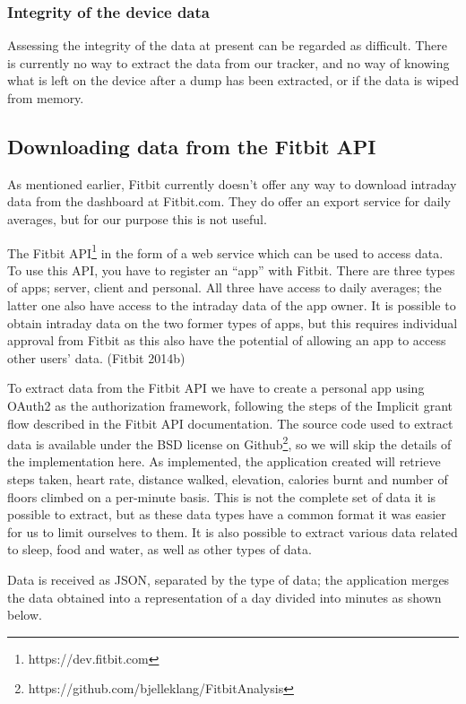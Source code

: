 \documentclass[a4paper,11pt,dvips]{article}
\begin{document}
\subsubsection{Integrity of the device data}
Assessing the integrity of the data at present can be regarded as difficult. There is currently no way to extract the data from our tracker, and no way of knowing what is left on the device after a dump has been extracted, or if the data is wiped from memory.


\subsection{Downloading data from the Fitbit API}
As mentioned earlier, Fitbit currently doesn't offer any way to download intraday data from the dashboard at Fitbit.com. They do offer an export service for daily averages, but for our purpose this is not useful.

The Fitbit API\footnote{https://dev.fitbit.com} in the form of a web service which can be used to access data. To use this API, you have to register an “app” with Fitbit. There are three types of apps; server, client and personal. All three have access to daily averages; the latter one also have access to the intraday data of the app owner. It is possible to obtain intraday data on the two former types of apps, but this requires individual approval from Fitbit as this also have the potential of allowing an app to access other users' data. (Fitbit 2014b)

To extract data from the Fitbit API we have to create a personal app using OAuth2 as the authorization framework, following the steps of the Implicit grant flow described in the Fitbit API documentation. The source code used to extract data is available under the BSD license on Github\footnote{https://github.com/bjelleklang/FitbitAnalysis}, so we will skip the details of the implementation here. As implemented, the application created will retrieve steps taken, heart rate, distance walked, elevation, calories burnt and number of floors climbed on a per-minute basis. This is not the complete set of data it is possible to extract, but as these data types have a common format it was easier for us to limit ourselves to them. It is also possible to extract various data related to sleep, food and water, as well as other types of data.

Data is received as JSON, separated by the type of data; the application merges the data obtained into a representation of a day divided into minutes as shown below.
\end{document}
